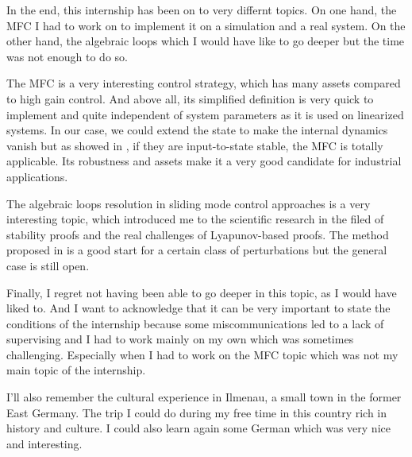 In the end, this internship has been on to very differnt topics. On one hand, the MFC I had to work on 
to implement it on a simulation and a real system. On the other hand, the algebraic loops which I would 
have like to go deeper but the time was not enough to do so.

The MFC is a very interesting control strategy, which has many assets compared to high gain control. And 
above all, its simplified definition is very quick to implement and quite independent of system parameters as 
it is used on linearized systems. In our case, we could extend the state to make the internal dynamics vanish but
as showed in \cite{Willkomm2023MFC}, if they are input-to-state stable, the MFC is totally applicable.
Its robustness and assets make it a very good candidate for industrial applications.

The algebraic loops resolution in sliding mode control approaches is a very interesting topic, which
introduced me to the scientific research in the filed of stability proofs and the real challenges 
of Lyapunov-based proofs. The method proposed in \cite{Laghrouche2017} is a good start for a certain class of
perturbations but the general case is still open. 

Finally, I regret not having been able to go deeper in this topic, as I would have liked to. And I want 
to acknowledge that it can be very important to state the conditions of the internship because some 
miscommunications led to a lack of supervising and I had to work mainly on my own which was sometimes challenging.
Especially when I had to work on the MFC topic which was not my main topic of the internship.


I'll also remember the cultural experience in Ilmenau, a small town in the former East Germany. The trip I could do 
during my free time in this country rich in history and culture. I could also learn again some German 
which was very nice and interesting.
